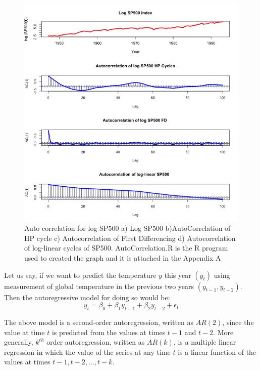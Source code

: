 \begin{figure}[!ht]
\centering
\includegraphics[scale=.65]{Images/ACSP500}
\caption{Auto correlation for log SP500 a) Log SP500 b)AutoCorrelation of HP cycle  c) Autocorrelation of First Differencing d) Autocorrelation of log-linear cycles of SP500. AutoCorrelation.R is the R program used to created the graph and it is attached in the Appendix A}
\label{fig:ACSP500}
\end{figure}
Let us say, if we want to predict the temperature $y$ this year $(y_t)$ using measurement of global temperature in the previous two years $(y_{t-1},y_{t-2})$. Then the autoregressive model for doing so would be:
\begin{equation}
y_t = \beta_{0} +\beta_{1}y_{t-1} +\beta_{2}y_{t-2}+\epsilon_t
\end{equation}

The above model is a second-order autoregression, written as $AR(2)$, since the value at time $t$ is predicted from the values at times $t-1$ and $t-2$. More generally, $k^{th}$ order autoregression, written as $AR(k)$, is a multiple linear regression in which the value of the series at any time $t$ is a linear function of the values at times $t-1,t-2,...,t-k$.

